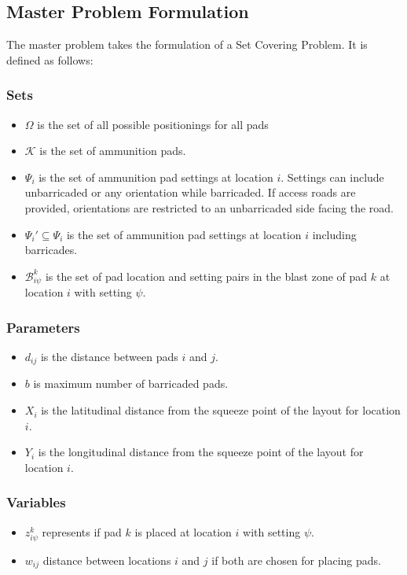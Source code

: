 \documentclass[10pt]{article}
\begin{document}
	\subsection{Master Problem Formulation}
	The master problem takes the formulation of a Set Covering Problem. It is defined as follows:
	
	\subsubsection{Sets}
	\begin{itemize}
		\item $\mathcal{\Omega}$ is the set of all possible positionings for all pads
		\item $\mathcal{K}$ is the set of ammunition pads.
		\item $\Psi_i$ is the set of ammunition pad settings at location $ i $. Settings can include unbarricaded or any orientation while barricaded. If access roads are provided, orientations are restricted to an unbarricaded side facing the road.
		\item $\Psi_i' \subseteq \Psi_i$ is the set of ammunition pad settings at location $ i $ including barricades.
		\item $ \mathcal{B}_{i\psi}^{k} $ is the set of pad location and setting pairs in the blast zone of pad $ k $ at location $ i $ with setting $ \psi $. 
	\end{itemize}
	
	\subsubsection{Parameters}
	\begin{itemize}
		\item $d_{ij}$ is the distance between pads $ i $ and $ j $.
		\item $ b $ is maximum number of barricaded pads.
		\item $ X_i $ is the latitudinal distance from the squeeze point of the layout for location $ i $.
		\item $ Y_i $ is the longitudinal distance from the squeeze point of the layout for location $ i $.
	\end{itemize}
	
	\subsubsection{Variables}
	\begin{itemize}
		\item $z_{i\psi}^{k} $ represents if pad $ k $ is placed at location $ i $ with setting $ \psi $.
		\item $ w_{ij} $ distance between locations $ i $ and $ j $ if both are chosen for placing pads.
	\end{itemize}
	
\end{document}
